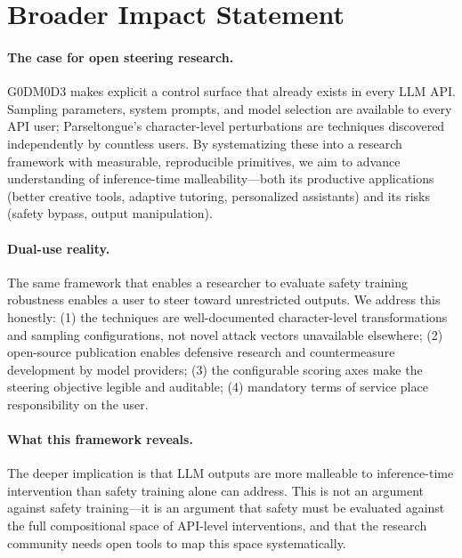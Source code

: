 \documentclass[11pt]{article}
\begin{document}
\section*{Broader Impact Statement}

\paragraph{The case for open steering research.} G0DM0D3 makes explicit a control surface that already exists in every LLM API. Sampling parameters, system prompts, and model selection are available to every API user; Parseltongue's character-level perturbations are techniques discovered independently by countless users. By systematizing these into a research framework with measurable, reproducible primitives, we aim to advance understanding of inference-time malleability---both its productive applications (better creative tools, adaptive tutoring, personalized assistants) and its risks (safety bypass, output manipulation).

\paragraph{Dual-use reality.} The same framework that enables a researcher to evaluate safety training robustness enables a user to steer toward unrestricted outputs. We address this honestly: (1) the techniques are well-documented character-level transformations and sampling configurations, not novel attack vectors unavailable elsewhere; (2) open-source publication enables defensive research and countermeasure development by model providers; (3) the configurable scoring axes make the steering objective legible and auditable; (4) mandatory terms of service place responsibility on the user.

\paragraph{What this framework reveals.} The deeper implication is that LLM outputs are more malleable to inference-time intervention than safety training alone can address. This is not an argument against safety training---it is an argument that safety must be evaluated against the full compositional space of API-level interventions, and that the research community needs open tools to map this space systematically.
\end{document}
